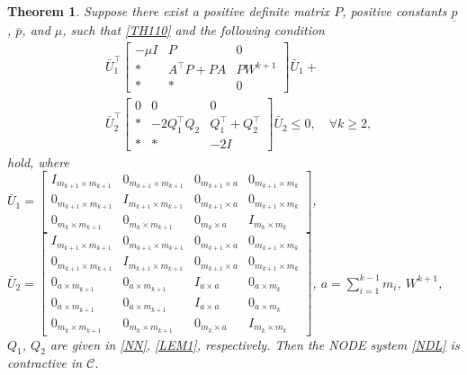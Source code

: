 \documentclass[journal,twoside,web]{ieeecolor}
\newtheorem{theorem}            {Theorem}[section]
\newcommand{\bbm}[1]{\left[\begin{matrix} #1 \end{matrix}\right]}
\begin{document}
\begin{theorem}\label{theorem11}
Suppose there exist a positive definite matrix $P$, positive constants $\underline{p}$, $\overline{p}$, and $\mu$, such that \eqref{TH110} and the following condition
\begin{equation}\label{TH121}
\begin{aligned}
&\bar{U}_1^\top
\bbm{-\mu I&P&0\\
   \ast&  A^\top P+PA &PW^{k+1}\\
  \ast& \ast & 0
}\bar{U}_1+\\&\bar{U}_2^\top\bbm{0&0&0\\\ast&
 -2Q_1^\top Q_2&Q_1^\top+Q_2^\top
 \\\ast&
\ast&-2I
}\bar{U}_2\leq 0, \quad\forall k\geq 2,
\end{aligned}
\end{equation}
hold, where \\$\bar{U}_1=\bbm{I_{m_{k+1}\times m_{k+1}} &0_{m_{k+1}\times m_{k+1}}&0_{m_{k+1}\times a} &0_{m_{k+1}\times m_{k}}\\0_{m_{k+1}\times m_{k+1}}&I_{m_{k+1}\times m_{k+1}}&0_{m_{k+1}\times a}&0_{m_{k+1}\times m_{k}}\\0_{m_{k}\times m_{k+1}}&0_{m_{k}\times m_{k+1}}&0_{m_{k}\times a}&I_{m_{k}\times m_{k}}}$, $\bar{U}_2=\bbm{I_{m_{k+1}\times m_{k+1}} &0_{m_{k+1}\times m_{k+1}}&0_{m_{k+1}\times a}&0_{m_{k+1}\times m_{k}}\\0_{m_{k+1}\times m_{k+1}}&I_{m_{k+1}\times m_{k+1}} &0_{m_{k+1}\times a}&0_{m_{k+1}\times m_{k}}\\0_{a\times m_{k+1}}&0_{a\times m_{k+1}}&I_{a\times a}&0_{a\times m_{k}}\\0_{a\times m_{k+1}}&0_{a\times m_{k+1}}&I_{a\times a}&0_{a\times m_{k}}\\0_{m_{k}\times m_{k+1}}&0_{m_{k}\times m_{k+1}}&0_{m_{k}\times a}&I_{m_{k}\times m_{k}}}$, $a=\sum_{i=1}^{k-1}m_i$, $W^{k+1}$, $Q_1$, $Q_2$ are given in \eqref{NN}, \eqref{LEM1}, respectively. Then the NODE system \eqref{NDL} is contractive in $\mathcal{C}$.
\end{theorem}
\end{document}
